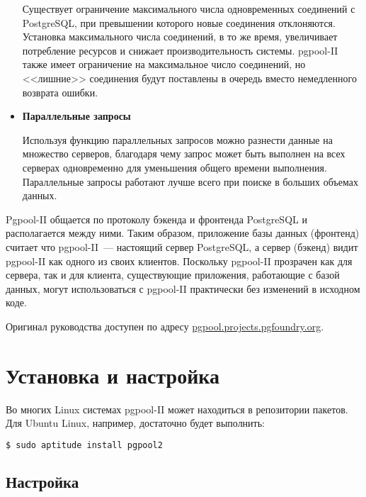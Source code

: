 \begin{itemize}
Существует ограничение максимального числа одновременных соединений с PostgreSQL, при превышении которого новые соединения отклоняются. Установка максимального числа соединений, в то же время, увеличивает потребление ресурсов и снижает производительность системы. pgpool-II также имеет ограничение на максимальное число соединений, но <<лишние>> соединения будут поставлены в очередь вместо немедленного возврата ошибки.

\item \textbf{Параллельные запросы}

Используя функцию параллельных запросов можно разнести данные на множество серверов, благодаря чему запрос может быть выполнен на всех серверах одновременно для уменьшения общего времени выполнения. Параллельные запросы работают лучше всего при поиске в больших объемах данных.

\end{itemize}

Pgpool-II общается по протоколу бэкенда и фронтенда PostgreSQL и располагается между ними. Таким образом, приложение базы данных (фронтенд) считает что pgpool-II~--- настоящий сервер PostgreSQL, а сервер (бэкенд) видит pgpool-II как одного из своих клиентов. Поскольку pgpool-II прозрачен как для сервера, так и для клиента, существующие приложения, работающие с базой данных, могут использоваться с pgpool-II практически без изменений в исходном коде.

Оригинал руководства доступен по адресу \href{http://pgpool.projects.pgfoundry.org/pgpool-II/doc/tutorial-en.html}{pgpool.projects.pgfoundry.org}.



\section{Установка и настройка}
\label{sec:pgpool-II-begin}

Во многих Linux системах pgpool-II может находиться в репозитории пакетов. Для Ubuntu Linux, например, достаточно будет выполнить:

\begin{lstlisting}[language=Bash,label=lst:pgpool3,caption=Установка pgpool-II]
$ sudo aptitude install pgpool2
\end{lstlisting}

\subsection{Настройка}

